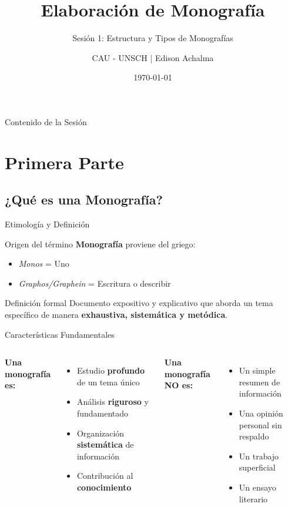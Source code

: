 \documentclass[xcolor=table,aspectratio=169,11pt]{beamer}
\title{Elaboración de Monografía}
\subtitle{Sesión 1:  Estructura y Tipos de Monografías}
\author{CAU - UNSCH | Edison Achalma }
\date{\today}
\begin{document}
	
	\begin{frame}
		\titlepage
	\end{frame}
	
	\begin{frame}{Contenido de la Sesión}
		\tableofcontents
	\end{frame}
	
	\section{Primera Parte}
	
	\subsection{¿Qué es una Monografía?}
	
	\begin{frame}{Etimología y Definición}
		\begin{block}{Origen del término}
			\textbf{Monografía} proviene del griego:
			\begin{itemize}
				\item \textit{Monos} = Uno
				\item \textit{Graphos/Graphein} = Escritura o describir
			\end{itemize}
		\end{block}
		
		\vspace{0.5cm}
		
		\begin{alertblock}{Definición formal}
			Documento expositivo y explicativo que aborda un tema específico de manera \textbf{exhaustiva, sistemática y metódica}.
		\end{alertblock}
	\end{frame}
	
	\begin{frame}{Características Fundamentales}
		\begin{columns}[T]
			\column{0.5\textwidth}
			\textbf{Una monografía es:}
			\begin{itemize}
				\item Estudio \textbf{profundo} de un tema único
				\item Análisis \textbf{riguroso} y fundamentado
				\item Organización \textbf{sistemática} de información
				\item Contribución al \textbf{conocimiento}
			\end{itemize}
			
			\column{0.5\textwidth}
			\textbf{Una monografía NO es:}
			\begin{itemize}
				\item Un simple resumen de información
				\item Una opinión personal sin respaldo
				\item Un trabajo superficial
				\item Un ensayo literario
			\end{itemize}
		\end{columns}
	\end{frame}
	
\end{document}
